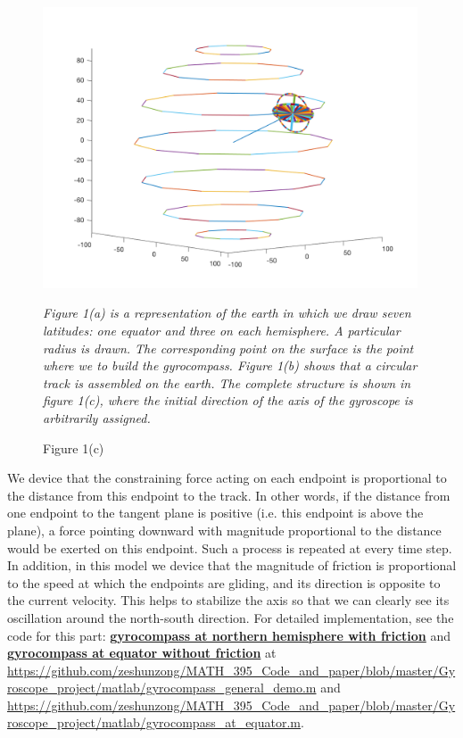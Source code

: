 \documentclass[12pt]{article}
\renewcommand{\(}{\left (}
\renewcommand{\)}{\right )}
\begin{document}
\begin{figure}[ht]
\begin{minipage}{0.33\textwidth}
		\includegraphics[width=0.99\textwidth]{gyro_structure.png}
		\caption*{\small Figure 1(c)}
	\end{minipage}

	\footnotesize
	\emph{Figure 1(a) is a representation of the earth in which we draw seven latitudes: one equator and three on each hemisphere. A particular radius is drawn. The corresponding point on the surface is the point where we to build the gyrocompass. Figure 1(b) shows that a circular track is assembled on the earth. The complete structure is shown in figure 1(c), where the initial direction of the axis of the gyroscope is arbitrarily assigned.}
\end{figure}

We device that the constraining force acting on each endpoint is proportional to the distance from this endpoint to the track. In other words, if the distance from one endpoint to the tangent plane is positive (i.e. this endpoint is above the plane), a force pointing downward with magnitude proportional to the distance would be exerted on this endpoint. Such a process is repeated at every time step. In addition, in this model we device that the magnitude of friction is proportional to the speed at which the endpoints are gliding, and its direction is opposite to the current velocity. This helps to stabilize the axis so that we can clearly see its oscillation around the north-south direction. For detailed implementation, see the code for this part: \href{https://github.com/zeshunzong/MATH_395_Code_and_paper/blob/master/Gyroscope_project/matlab/gyrocompass_general_demo.m}{\textbf{gyrocompass at northern hemisphere with friction}} and \href{https://github.com/zeshunzong/MATH_395_Code_and_paper/blob/master/Gyroscope_project/matlab/gyrocompass_at_equator.m}{\textbf{gyrocompass at equator without friction}} at \url{https://github.com/zeshunzong/MATH_395_Code_and_paper/blob/master/Gyroscope_project/matlab/gyrocompass_general_demo.m} and \url{https://github.com/zeshunzong/MATH_395_Code_and_paper/blob/master/Gyroscope_project/matlab/gyrocompass_at_equator.m}.
\end{document}
